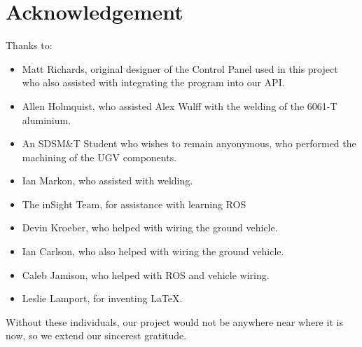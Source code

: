 %
%
%
%


\section{Acknowledgement}
Thanks to:

\begin{itemize}
	\item[]Matt Richards, original designer of the Control Panel used in this project who also assisted with integrating the program into our API.

	\item[]Allen Holmquist, who assisted Alex Wulff with the welding of the 6061-T aluminium.

	\item[]An SDSM\&T Student who wishes to remain anyonymous, who performed the machining of the UGV components.

	\item[]Ian Markon, who assisted with welding.

	\item[]The inSight Team, for assistance with learning ROS

	\item[]Devin Kroeber, who helped with wiring the ground vehicle.

	\item[]Ian Carlson, who also helped with wiring the ground vehicle.

	\item[]Caleb Jamison, who helped with ROS and vehicle wiring.

	\item[]Leslie Lamport, for inventing LaTeX.
\end{itemize}
Without these individuals, our project would not be anywhere near where it is now, so we extend our sincerest gratitude.


